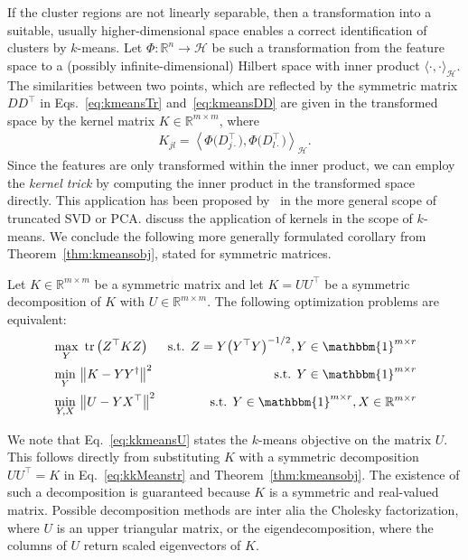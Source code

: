 If the cluster regions are not linearly separable, then a transformation into a suitable, usually higher-dimensional space enables a correct identification of clusters by $k$-means. Let $\Phi:\mathbb{R}^n\rightarrow \mathcal{H}$ be such a transformation from the feature space to a (possibly infinite-dimensional) Hilbert space with inner product $\langle\cdot,\cdot\rangle_\mathcal{H}$. The similarities between two points, which are reflected by the symmetric matrix $DD^\top$ in Eqs.~\eqref{eq:kmeansTr} and~\eqref{eq:kmeansDD} are given in the transformed space by the kernel matrix $K\in\mathbb{R}^{m\times m}$, where   
\begin{align}
K_{jl} = \left\langle\Phi\bigl(D_{j\cdot}^\top\bigr),\Phi\bigl(D_{l\cdot}^\top\bigr)\right\rangle_\mathcal{H}. \label{eq:kernel}
\end{align}
Since the features are only transformed within the inner product, we can employ the \emph{kernel trick} by computing the inner product in the transformed space directly. This application has been proposed by~\cite{scholkopf1998nonlinear} in the more general scope of truncated SVD or PCA. \cite{ding2005equivalence} discuss the application of kernels in the scope of $k$-means. 
We conclude the following more generally formulated corollary from Theorem~\ref{thm:kmeansobj}, stated for symmetric matrices.
\begin{corollary}\label{thm:kkmeansobj}
Let $K\in\mathbb{R}^{m\times m}$ be a symmetric matrix and let $K=UU^\top$ be a symmetric decomposition of $K$ with $U\in\mathbb{R}^{m\times m}$. The following optimization problems are equivalent:
\begin{align}
&\max_{Y}\ \tr\left(Z^\top K Z\right)  & \text{s.t. } Z=Y\bigl(Y^\top Y\bigr)^{-1/2}, Y\in\mathbbm{1}^{m\times r}\label{eq:kkMeanstr}\\
&\min_{Y}\ \bigl\lVert K - YY^\dagger\bigr\rVert ^2 & \text{s.t. }  Y\in\mathbbm{1}^{m\times r}\label{eq:kkMeansnorm}\\
&\min_{Y,X}\ \bigl\lVert U-YX^\top\bigr\rVert ^2 & \text{s.t. } Y\in\mathbbm{1}^{m\times r}, X\in\mathbb{R}^{m\times r} \label{eq:kkmeansU}
\end{align}
\end{corollary}
We note that Eq.~\eqref{eq:kkmeansU} states the $k$-means objective on the matrix $U$. This follows directly from substituting $K$ with a symmetric decomposition $UU^\top=K$ in Eq.~\eqref{eq:kkMeanstr} and Theorem~\ref{thm:kmeansobj}. The existence of such a decomposition is guaranteed because $K$ is a symmetric and real-valued matrix. Possible decomposition methods are inter alia the Cholesky factorization, where $U$ is an upper triangular matrix, or the eigendecomposition, where the columns of $U$ return scaled eigenvectors of $K$.    
